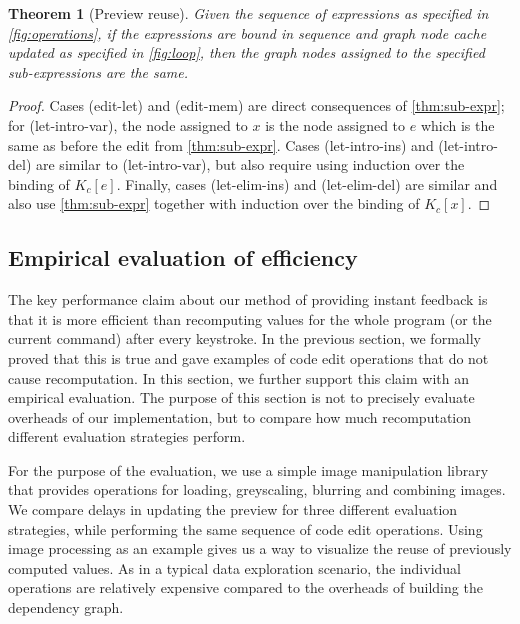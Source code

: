 \documentclass[english,crc,references=cleveref]{programming}
\newcounter{thc}
\theoremstyle{plain}
\newtheorem{theorem}[thc]{Theorem}
\theoremstyle{definition}
\newcommand{\rname}[1]{{\sffamily(#1)}}
\begin{document}


\begin{theorem}[Preview reuse]
\label{thm:preview-reuse}
Given the sequence of expressions as specified in \cref{fig:operations}, if the expressions
are bound in sequence and graph node cache updated as specified in \cref{fig:loop}, then
the graph nodes assigned to the specified sub-expressions are the same.
\end{theorem}
\begin{proof}
Cases \rname{edit-let} and \rname{edit-mem} are direct consequences of \cref{thm:sub-expr};
for \rname{let-intro-var}, the node assigned to $x$ is the node assigned to $e$ which is the
same as before the edit from \cref{thm:sub-expr}.
Cases \rname{let-intro-ins} and \rname{let-intro-del} are similar to \rname{let-intro-var}, but
also require using induction over the binding of $K_c[e]$. Finally, cases \rname{let-elim-ins}
and \rname{let-elim-del} are similar and also use \cref{thm:sub-expr}
together with induction over the binding of $K_c[x]$.
\end{proof}


\subsection{Empirical evaluation of efficiency}
\label{sec:evaluation-empirical}

The key performance claim about our method of providing instant feedback is that it is more
efficient than recomputing values for the whole program (or the current command) after every
keystroke. In the previous section, we formally proved that this is true and gave examples of
code edit operations that do not cause recomputation. In this section, we further support this
claim with an empirical evaluation. The purpose of this section is not to precisely evaluate
overheads of our implementation, but to compare how much recomputation different evaluation
strategies perform.

For the purpose of the evaluation, we use a simple image manipulation library that provides
operations for loading, greyscaling, blurring and combining images. We compare delays in
updating the preview for three different evaluation strategies, while performing the same
sequence of code edit operations. Using image processing as an example gives us a way to
visualize the reuse of previously computed values. As in a typical data exploration scenario,
the individual operations are relatively expensive compared to the overheads of building the
dependency graph.
\end{document}
